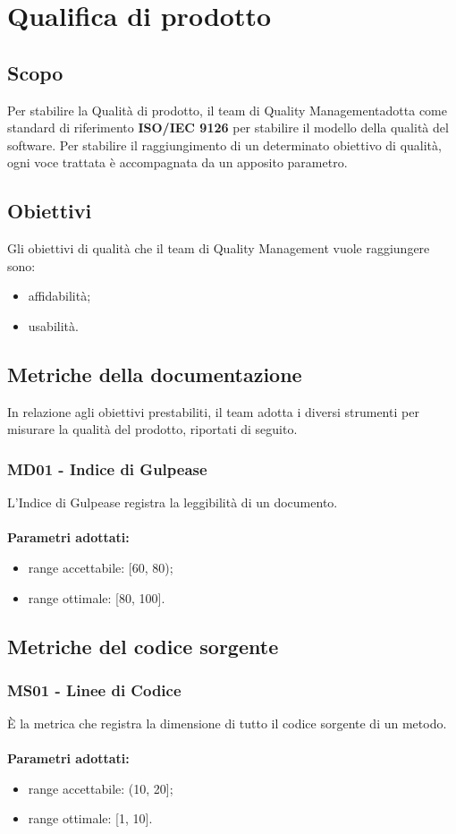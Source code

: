 \section{Qualifica di prodotto}
\subsection{Scopo}
Per stabilire la Qualità di prodotto, il team di Quality Management\glo adotta come standard di riferimento \textbf{ISO/IEC 9126} per stabilire il modello della qualità del software. Per stabilire il raggiungimento di un determinato obiettivo di qualità, ogni voce trattata è accompagnata da un apposito parametro.
\subsection{Obiettivi}
Gli obiettivi di qualità che il team di Quality Management vuole raggiungere sono:
\begin{itemize}
\item affidabilità;
\item usabilità.
\end{itemize}
\subsection{Metriche della documentazione}
In relazione agli obiettivi prestabiliti, il team adotta i diversi strumenti per misurare la qualità del prodotto, riportati di seguito.
\subsubsection{MD01 - Indice di Gulpease}
L'Indice di Gulpease registra la leggibilità di un documento. \\ \\ 
\textbf{Parametri adottati:} 
\begin{itemize}
\item range accettabile: [60, 80);
\item range ottimale: [80, 100].
\end{itemize}
\subsection{Metriche del codice sorgente}
\subsubsection{MS01 - Linee di Codice}
È la metrica che registra la dimensione di tutto il codice sorgente di un metodo.\\ \\
\textbf{Parametri adottati:}
\begin{itemize}
\item range accettabile: (10, 20];
\item range ottimale: [1, 10].
\end{itemize}
